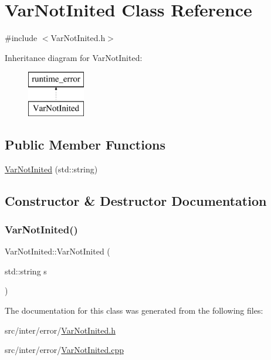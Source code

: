 \hypertarget{class_var_not_inited}{}\section{Var\+Not\+Inited Class Reference}
\label{class_var_not_inited}


{\ttfamily \#include $<$Var\+Not\+Inited.\+h$>$}

Inheritance diagram for Var\+Not\+Inited\+:\begin{figure}[H]
\begin{center}
\leavevmode
\includegraphics[height=2.000000cm]{class_var_not_inited}
\end{center}
\end{figure}
\subsection*{Public Member Functions}
\begin{DoxyCompactItemize}
\item 
\hyperlink{class_var_not_inited_a14d78a6013df47440f2eba2074c1ef62}{Var\+Not\+Inited} (std\+::string)
\end{DoxyCompactItemize}


\subsection{Constructor \& Destructor Documentation}
\mbox{\label{class_var_not_inited_a14d78a6013df47440f2eba2074c1ef62}} 
\subsubsection{\texorpdfstring{Var\+Not\+Inited()}{VarNotInited()}}
{\footnotesize\ttfamily Var\+Not\+Inited\+::\+Var\+Not\+Inited (\begin{DoxyParamCaption}\item[{std\+::string}]{s }\end{DoxyParamCaption})\hspace{0.3cm}{\ttfamily [explicit]}}



The documentation for this class was generated from the following files\+:\begin{DoxyCompactItemize}
\item 
src/inter/error/\hyperlink{_var_not_inited_8h}{Var\+Not\+Inited.\+h}\item 
src/inter/error/\hyperlink{_var_not_inited_8cpp}{Var\+Not\+Inited.\+cpp}\end{DoxyCompactItemize}
